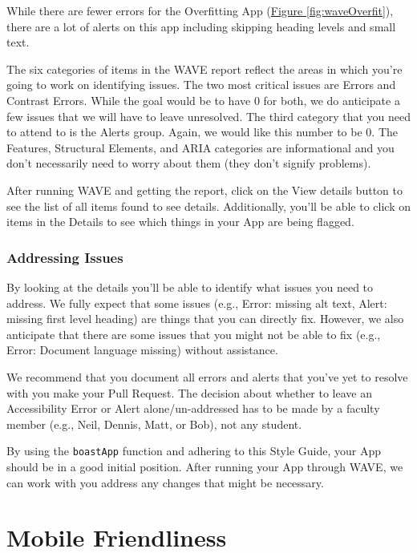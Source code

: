 \documentclass[
]{book}
\begin{document}
While there are fewer errors for the Overfitting App (\protect\hyperlink{waveOverfit}{Figure \ref{fig:waveOverfit}}), there are a lot of alerts on this app including skipping heading levels and small text.

The six categories of items in the WAVE report reflect the areas in which you're going to work on identifying issues. The two most critical issues are Errors and Contrast Errors. While the goal would be to have 0 for both, we do anticipate a few issues that we will have to leave unresolved. The third category that you need to attend to is the Alerts group. Again, we would like this number to be 0. The Features, Structural Elements, and ARIA categories are informational and you don't necessarily need to worry about them (they don't signify problems).

After running WAVE and getting the report, click on the View details button to see the list of all items found to see details. Additionally, you'll be able to click on items in the Details to see which things in your App are being flagged.

\hypertarget{addressing-issues}{%
\subsection{Addressing Issues}\label{addressing-issues}}

By looking at the details you'll be able to identify what issues you need to address. We fully expect that some issues (e.g., Error: missing alt text, Alert: missing first level heading) are things that you can directly fix. However, we also anticipate that there are some issues that you might not be able to fix (e.g., Error: Document language missing) without assistance.

We recommend that you document all errors and alerts that you've yet to resolve with you make your Pull Request. The decision about whether to leave an Accessibility Error or Alert alone/un-addressed has to be made by a faculty member (e.g., Neil, Dennis, Matt, or Bob), not any student.

By using the \texttt{boastApp} function and adhering to this Style Guide, your App should be in a good initial position. After running your App through WAVE, we can work with you address any changes that might be necessary.

\hypertarget{mobile}{%
\chapter{Mobile Friendliness}\label{mobile}}
\end{document}
